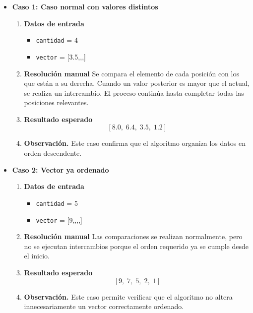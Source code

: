 \documentclass[12pt,twoside]{book}
\begin{document}
						\begin{itemize}
							
							\item \textbf{Caso 1: Caso normal con valores distintos}
							\begin{enumerate}
								\item \textbf{Datos de entrada}
								\begin{itemize}
									\item \texttt{cantidad} = 4
									\item \texttt{vector} = [3.5,,,]
								\end{itemize}
								\item \textbf{Resolución manual}
								Se compara el elemento de cada posición con los que están a su derecha. Cuando un valor posterior es mayor que el actual, se realiza un intercambio. El proceso continúa hasta completar todas las posiciones relevantes.
								\item \textbf{Resultado esperado}
								\[
								[8.0,\; 6.4,\; 3.5,\; 1.2]
								\]
								\item \textbf{Observación.} Este caso confirma que el algoritmo organiza los datos en orden descendente.
							\end{enumerate}
							
							
							\item \textbf{Caso 2: Vector ya ordenado}
							\begin{enumerate}
								\item \textbf{Datos de entrada}
								\begin{itemize}
									\item \texttt{cantidad} = 5
									\item \texttt{vector} = [9,,,,]
								\end{itemize}
								\item \textbf{Resolución manual}
								Las comparaciones se realizan normalmente, pero no se ejecutan intercambios porque el orden requerido ya se cumple desde el inicio.
								\item \textbf{Resultado esperado}
								\[
								[9,\; 7,\; 5,\; 2,\; 1]
								\]
								\item \textbf{Observación.} Este caso permite verificar que el algoritmo no altera innecesariamente un vector correctamente ordenado.
							\end{enumerate}
							

\end{itemize}
\end{document}
